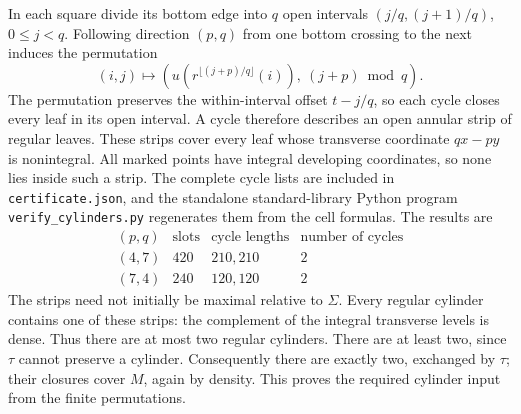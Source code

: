 \documentclass[11pt]{article}
\theoremstyle{remark}
\begin{document}
In each square divide its bottom edge into $q$ open intervals
$(j/q,(j+1)/q)$, $0\le j<q$. Following direction $(p,q)$ from one bottom
crossing to the next induces the permutation
\[
 (i,j)\longmapsto
 \left(u\left(r^{\lfloor(j+p)/q\rfloor}(i)\right),\ (j+p)\bmod q\right).
\]
The permutation preserves the within-interval offset $t-j/q$, so each cycle closes every leaf in its open interval. A cycle therefore describes an open annular strip of regular leaves. These strips
cover every leaf whose transverse coordinate $qx-py$ is nonintegral.
All marked points have integral developing coordinates, so none lies
inside such a strip. The complete cycle lists are included in
\texttt{certificate.json}, and the standalone standard-library Python program
\texttt{verify\_cylinders.py} regenerates them from the cell formulas.
The results are
\[
\begin{array}{c|r|c|c}
(p,q)&\text{slots}&\text{cycle lengths}&\text{number of cycles}\\\hline
(4,7)&420&210,210&2\\
(7,4)&240&120,120&2
\end{array}
\]
The strips need not initially be maximal relative to $\Sigma$.
Every regular cylinder contains one of these strips: the complement of the
integral transverse levels is dense. Thus there are at most two regular
cylinders. There are at least two, since $\tau$ cannot preserve a cylinder.
Consequently there are exactly two, exchanged by $\tau$; their closures cover
$M$, again by density. This proves the required cylinder input from the
finite permutations.
\end{document}
